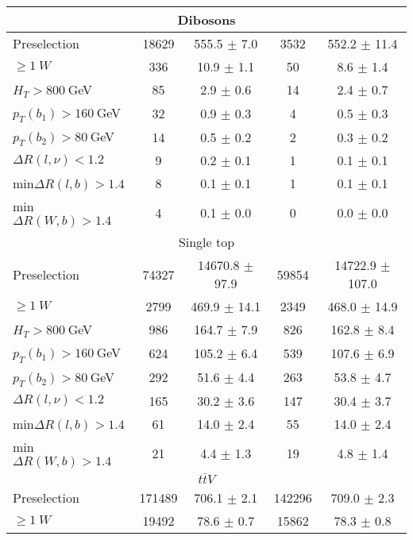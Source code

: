 \begin{tabular}{lcccc}
\midrule
\multicolumn{5}{c}{Dibosons} \\
\midrule 
Preselection            & 18629  & 555.5 	$\pm$ 	7.0 	 & 3532  & 552.2 	$\pm$ 	11.4 	\\
$\geq 1~W$              & 336  & 10.9 	        $\pm$ 	1.1 	 & 50  & 8.6 	        $\pm$ 	1.4 	\\
$H_T>800~$GeV           & 85  & 2.9 	        $\pm$ 	0.6 	 & 14  & 2.4 	        $\pm$ 	0.7 	\\
$p_T(b_1) > 160~$GeV    & 32  & 0.9 	        $\pm$ 	0.3 	 & 4  & 0.5 	        $\pm$ 	0.3 	\\
$p_T(b_2) >80~$GeV      & 14  & 0.5 	        $\pm$ 	0.2 	 & 2  & 0.3 	        $\pm$ 	0.2 	\\
$\Delta R(l,\nu)<1.2$   & 9  & 0.2 	        $\pm$ 	0.1 	 & 1  & 0.1 	        $\pm$ 	0.1 	\\
min$\Delta R(l,b)>1.4$  & 8  & 0.1 	        $\pm$ 	0.1 	 & 1  & 0.1 	        $\pm$ 	0.1 	\\
min$\Delta R(W,b)>1.4$  & 4  & 0.1 	        $\pm$ 	0.0 	 & 0  & 0.0 	        $\pm$ 	0.0 	\\
\midrule
\multicolumn{5}{c}{Single top} \\
\midrule 
Preselection            & 74327  & 14670.8 	$\pm$ 	97.9 	 & 59854  & 14722.9 	$\pm$ 	107.0 	\\
$\geq 1~W$              & 2799  & 469.9 	$\pm$ 	14.1 	 & 2349  & 468.0 	$\pm$ 	14.9 	\\
$H_T>800~$GeV           & 986  & 164.7 	        $\pm$ 	7.9 	 & 826  & 162.8 	$\pm$ 	8.4 	\\
$p_T(b_1) > 160~$GeV    & 624  & 105.2 	        $\pm$ 	6.4 	 & 539  & 107.6 	$\pm$ 	6.9 	\\
$p_T(b_2) >80~$GeV      & 292  & 51.6 	        $\pm$ 	4.4 	 & 263  & 53.8 	        $\pm$ 	4.7 	\\
$\Delta R(l,\nu)<1.2$   & 165  & 30.2 	        $\pm$ 	3.6 	 & 147  & 30.4 	        $\pm$ 	3.7 	\\
min$\Delta R(l,b)>1.4$  & 61  & 14.0 	        $\pm$ 	2.4 	 & 55  & 14.0 	        $\pm$ 	2.4 	\\
min$\Delta R(W,b)>1.4$  & 21  & 4.4 	        $\pm$ 	1.3 	 & 19  & 4.8 	        $\pm$ 	1.4 	\\
\midrule
\multicolumn{5}{c}{$t\bar{t}V$} \\
\midrule 
Preselection            & 171489  & 706.1 	$\pm$ 	2.1 	 & 142296  & 709.0 	$\pm$ 	2.3 	\\
$\geq 1~W$              & 19492  & 78.6 	$\pm$ 	0.7 	 & 15862  & 78.3 	$\pm$ 	0.8 	\\

\end{tabular}
